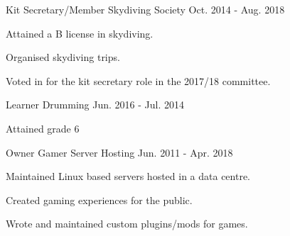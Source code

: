 

\begin{cventries}

  \cventry
    {Kit Secretary/Member} %
    {Skydiving Society} %
    {} %
    {Oct. 2014 - Aug. 2018} %
    {
      \begin{cvitems} %
        \item {Attained a B license in skydiving.}
        \item {Organised skydiving trips.}
        \item {Voted in for the kit secretary role in the 2017/18 committee.}
      \end{cvitems}
    }

  \cventry
    {Learner} %
    {Drumming} %
    {} %
    {Jun. 2016 - Jul. 2014} %
    {
      \begin{cvitems} %
        \item {Attained grade 6}
      \end{cvitems}
    }

  \cventry
    {Owner} %
    {Gamer Server Hosting} %
    {} %
    {Jun. 2011 - Apr. 2018} %
    {
      \begin{cvitems} %
        \item {Maintained Linux based servers hosted in a data centre.}
        \item {Created gaming experiences for the public.}
        \item {Wrote and maintained custom plugins/mods for games.}
      \end{cvitems}
    }

\end{cventries}
